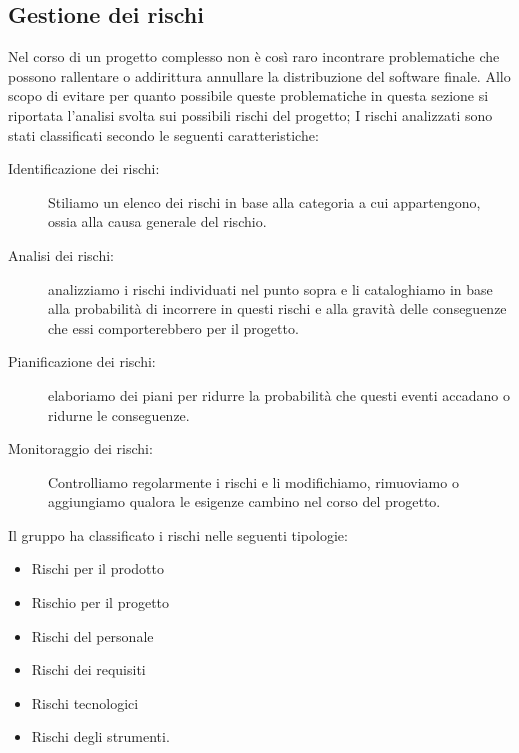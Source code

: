 \documentclass[../piano-di-progetto.tex]{subfiles}
\begin{document}
	\subsection{Gestione dei rischi}%
  \label{sub:gestione_dei_rischi}
  Nel corso di un progetto complesso non è così raro incontrare problematiche che possono rallentare o addirittura annullare la distribuzione del software finale.
  Allo scopo di evitare per quanto possibile queste problematiche in questa sezione si riportata l'analisi svolta sui possibili rischi del progetto; I rischi analizzati sono stati classificati secondo le seguenti caratteristiche:
  \begin{description}
      \item[Identificazione dei rischi:] Stiliamo un elenco dei rischi in base alla categoria a cui appartengono, ossia alla causa generale del rischio.
      \item[Analisi dei rischi:] analizziamo i rischi individuati nel punto sopra e li cataloghiamo in base alla probabilità di incorrere in questi rischi e alla gravità delle conseguenze che essi comporterebbero per il progetto.
      \item[Pianificazione dei rischi:] elaboriamo dei piani per ridurre la probabilità che questi eventi accadano o ridurne le conseguenze.
      \item[Monitoraggio dei rischi:] Controlliamo regolarmente i rischi e li modifichiamo, rimuoviamo o aggiungiamo qualora le esigenze cambino nel corso del progetto.
    \end{description}
    Il gruppo ha classificato i rischi nelle seguenti tipologie:
    \begin{itemize}
      \item Rischi per il prodotto
      \item Rischio per il progetto
      \item Rischi del personale
      \item Rischi dei requisiti
      \item Rischi tecnologici
      \item Rischi degli strumenti.
    \end{itemize}
\end{document}

